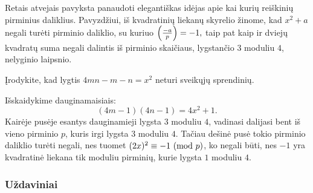 Retais atvejais pavyksta panaudoti elegantiškas idėjas apie kai kurių
reiškinių pirminius daliklius. Pavyzdžiui, iš kvadratinių liekanų skyrelio
žinome, kad $x^2 + a$ negali turėti pirminio daliklio, su kuriuo
$\left(\frac{-a}{p}\right) = -1,$ taip pat kaip ir dviejų kvadratų suma negali dalintis iš
pirminio skaičiaus, lygstančio $3$ moduliu $4$, nelyginio laipsnio.

\begin{pav} 
  Įrodykite, kad lygtis $4mn - m - n = x^2$ neturi sveikųjų sprendinių.
\end{pav}

\begin{sprendimas}
  Išskaidykime dauginamaisiais: $$(4m-1)(4n-1) = 4x^2 + 1.$$ Kairėje pusėje
  esantys dauginamieji lygsta $3$ moduliu $4$, vadinasi dalijasi bent iš
  vieno pirminio $p$, kuris irgi lygsta $3$ moduliu $4$. Tačiau dešinė
  pusė tokio pirminio daliklio turėti negali, nes tuomet $(2x)^2 \equiv -1
  \ (\text{mod } p)$, ko negali būti, nes $-1$ yra kvadratinė liekana tik moduliu
  pirminių, kurie lygsta $1$ moduliu $4$.
\end{sprendimas}

\subsubsection{Uždaviniai}

